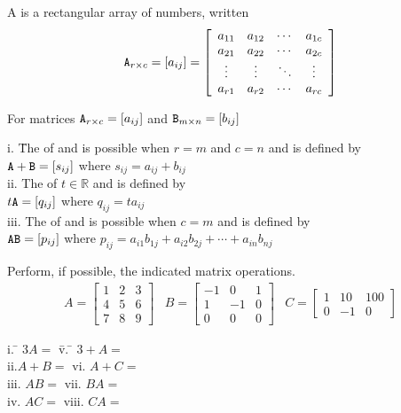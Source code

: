 \begin{defn}
	A  is a rectangular array of numbers, written \[\texttt{A}_{r \times c}= [a_{ij}] =\left[ \begin{array}{cccc}
	a_{11} & a_{12} & \cdots &  a_{1c}  \\
	a_{21} & a_{22} & \cdots &  a_{2c}  \\
	\vdots & \vdots & \ddots & \vdots  \\
	a_{r1} & a_{r2} & \cdots & a_{rc}
	\end{array} \right] \]
\end{defn}
\vspace{.5cm}
\begin{defn}
	For matrices $\texttt{A}_{r \times c} =[a_{ij}]$ and $\texttt{B}_{ m \times n} = [b_{ij}]$ 
	\begin{tabbing}
		\indent i. \quad  \= The  of  and  is possible when $r=m$ and $c=n$ and is defined by\\  \> \indent $\texttt{A}+\texttt{B} = [s_{ij}]$  where $s_{ij}=a_{ij} + b_{ij}$\\
		\indent ii.\> The  of $t \in \mathbb{R}$ and  is defined by\\ \> \indent  $t\texttt{A} = [q_{ij}]$  where $q_{ij} = ta_{ij}$ \\
		\indent iii.\> The  of  and  is possible when $c=m$ and is defined by\\ \> \indent  $\texttt{AB} = [p_{ij}]$  where $p_{ij} = a_{i1}b_{1j}+a_{i2}b_{2j}+\cdots+a_{in}b_{nj} $
	\end{tabbing}
\end{defn}
\vspace{.5cm}
\begin{myexa}[\bd{a}]
	Perform, if possible, the indicated matrix operations. 
	\[ \begin{array}{ccc}
		A=\left[ \begin{array}{ccc} 1&2&3 \\ 4&5&6\\ 7&8&9 \end{array}\right] & B=\left[ \begin{array}{rrr} -1&0&1 \\ 1&-1&0\\ 0&0&0 \end{array}\right] & C=\left[ \begin{array}{ccc} 1&10&100 \\ 0&-1&0 \end{array}\right]
	\end{array} \]
	 \begin{tabbing}
	 	\indent i. \quad  \= $3A=$ \hspace{2 in} \= v. \quad \= $3+A =$\\
	 	\indent ii.\>$A+B =$ \> vi. \> $A+C =$ \\
	 	\indent iii. \> $AB =$ \> vii. \> $BA =$  \\
	 	\indent iv. \> $AC =$ \> viii. \> $CA =$ 
	 \end{tabbing}
\end{myexa}

